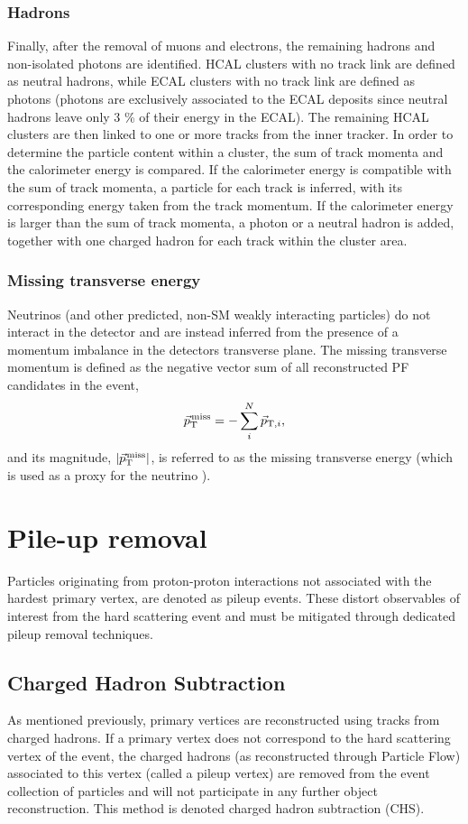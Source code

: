 \subsubsection{Hadrons}
Finally, after the removal of muons and electrons, the remaining hadrons and non-isolated photons are identified. HCAL clusters with no track link are defined as neutral hadrons, while ECAL clusters with no track link are defined as photons (photons are exclusively associated to the ECAL deposits since neutral hadrons leave only 3 \% of their energy in the ECAL).
The remaining HCAL clusters are then linked to one or more tracks from the inner tracker. In order to determine the particle content within a cluster, the sum of track momenta and the calorimeter energy is compared. If the calorimeter energy is compatible with the sum of track momenta, a particle for each track is inferred, with its corresponding energy taken from the track momentum. If the calorimeter energy is larger than the sum of track momenta, a photon or a neutral hadron is added, together with one charged hadron for each track within the cluster area.

\subsubsection{Missing transverse energy}
Neutrinos (and other predicted, non-SM weakly interacting particles) do not interact in the detector and are instead inferred from the presence of a momentum imbalance in the detectors transverse plane. The missing transverse momentum is defined as the negative \PT vector sum of all reconstructed PF candidates in the event,
\begin{equation}
{\vec p}_{\mathrm{T}}^{\kern1pt\text{miss}} = -\sum_{i}^{N}{\vec p}_{\mathrm{T},i},
\end{equation}
and its magnitude, $|{\vec p}_{\mathrm{T}}^{\kern1pt\text{miss}}|$, is referred to as the missing transverse energy \ETmiss (which is used as a proxy for the neutrino \PT).
 
\section{Pile-up removal}

Particles originating from proton-proton interactions not associated with the hardest primary vertex, are denoted as pileup events.
These distort observables of interest from the hard scattering event and must be mitigated through dedicated pileup removal techniques.

\subsection{Charged Hadron Subtraction}
\label{subsub:objreco:chs}
As mentioned previously, primary vertices are reconstructed using tracks from charged hadrons. If a primary vertex does not correspond to the hard scattering vertex of the event, the charged hadrons (as reconstructed through Particle Flow) associated to this vertex (called a pileup vertex) are removed from the event collection of particles and will not participate in any further object reconstruction. This method is denoted charged hadron subtraction (CHS).

